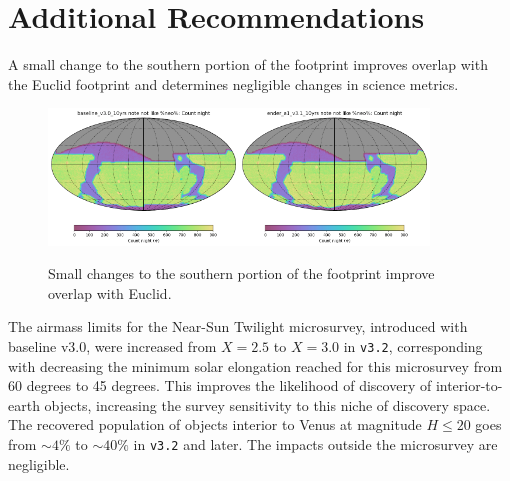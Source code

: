 \section{Additional Recommendations}\label{sec:additional}

A small change to the southern portion of the footprint improves overlap with the Euclid footprint and determines negligible changes in science metrics. 
\begin{figure}
\centering
\includegraphics[width=0.45\textwidth]{figures/3.0_south.png}\includegraphics[width=0.45\textwidth]{figures/3.1_south.png}

\caption{Small changes to the southern portion of the footprint improve overlap with Euclid.}
\end{figure}

The airmass limits for the Near-Sun Twilight microsurvey, introduced with baseline v3.0, were increased from $X=2.5$ to $X=3.0$ in \texttt{v3.2}, corresponding with decreasing the minimum solar elongation reached for this microsurvey from 60 degrees to 45 degrees. This improves the likelihood of discovery of interior-to-earth objects, increasing the survey sensitivity to this niche of discovery space. The recovered population of objects
interior to Venus at magnitude $H\leq20$ goes from $\sim4\%$ to $\sim40\%$ in \texttt{v3.2} and later. The impacts outside the microsurvey are negligible.

